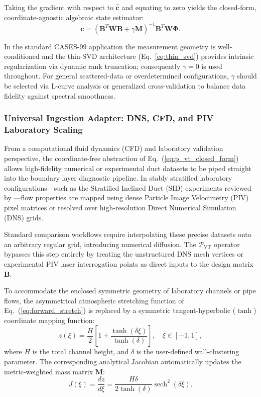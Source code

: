 Taking the gradient with respect to $\mathbf{\hat{c}}$ and equating to zero yields the closed-form, coordinate-agnostic algebraic state estimator:
\begin{equation}
\mathbf{c} = \left( \mathbf{B}^{T} \mathbf{W} \mathbf{B} + \gamma \mathbf{M} \right)^{-1} \mathbf{B}^{T} \mathbf{W} \mathbf{\Phi}.
\label{eq:p_vt_closed_form}
\end{equation}

In the standard CASES-99 application the measurement geometry is well-conditioned and the thin-SVD architecture (Eq.~\ref{eq:thin_svd}) provides intrinsic regularization via dynamic rank truncation; consequently $\gamma = 0$ is used throughout. For general scattered-data or overdetermined configurations, $\gamma$ should be selected via L-curve analysis or generalized cross-validation to balance data fidelity against spectral smoothness.

\subsubsection{Universal Ingestion Adapter: DNS, CFD, and PIV Laboratory Scaling}
\label{sec:extensions:cfd_ingest}

From a computational fluid dynamics (CFD) and laboratory validation perspective, the coordinate-free abstraction of Eq.~(\ref{eq:p_vt_closed_form}) allows high-fidelity numerical or experimental duct datasets to be piped straight into the boundary layer diagnostic pipeline. In stably stratified laboratory configurations—such as the Stratified Inclined Duct (SID) experiments reviewed by \citet{Lefauve2025}—flow properties are mapped using dense Particle Image Velocimetry (PIV) pixel matrices or resolved over high-resolution Direct Numerical Simulation (DNS) grids.

Standard comparison workflows require interpolating these precise datasets onto an arbitrary regular grid, introducing numerical diffusion. The $\mathcal{P}_{\mathrm{VT}}$ operator bypasses this step entirely by treating the unstructured DNS mesh vertices or experimental PIV laser interrogation points as direct inputs to the design matrix $\mathbf{B}$.

To accommodate the enclosed symmetric geometry of laboratory channels or pipe flows, the asymmetrical atmospheric stretching function of Eq.~(\ref{eq:forward_stretch}) is replaced by a symmetric tangent-hyperbolic ($\tanh$) coordinate mapping function:
\begin{equation}
z(\xi) = \frac{H}{2} \left[ 1 + \frac{\tanh(\delta \xi)}{\tanh(\delta)} \right], \quad \xi \in [-1, 1],
\label{eq:lab_symmetric_stretch}
\end{equation}
where $H$ is the total channel height, and $\delta$ is the user-defined wall-clustering parameter. The corresponding analytical Jacobian automatically updates the metric-weighted mass matrix $\mathbf{M}$:
\begin{equation}
J(\xi) = \frac{dz}{d\xi} = \frac{H \delta}{2 \tanh(\delta)} \operatorname{sech}^2(\delta \xi).
\label{eq:jacobian_lab_symmetric}
\end{equation}

